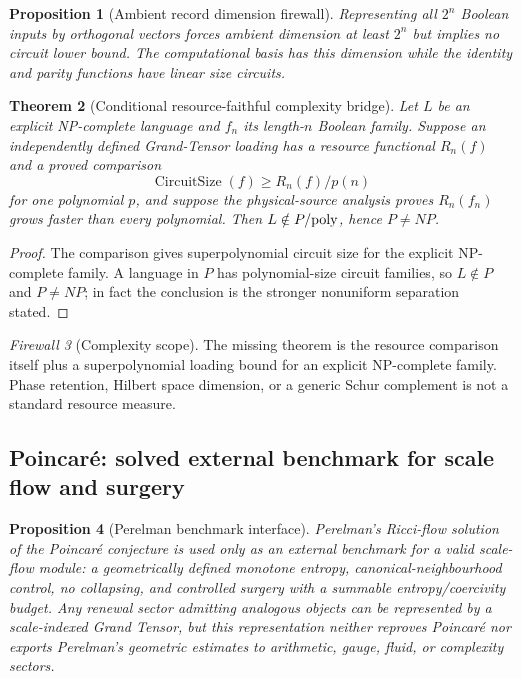 \documentclass[11pt]{article}
\newtheorem{theorem}{Theorem}[section]
\newtheorem{proposition}[theorem]{Proposition}
\theoremstyle{definition}
\theoremstyle{remark}
\newtheorem{firewall}[theorem]{Firewall}
\begin{document}
\begin{proposition}[Ambient record dimension firewall]
\label{prop:PvsNP-dimension-master}
Representing all $2^n$ Boolean inputs by orthogonal vectors forces ambient
dimension at least $2^n$ but implies no circuit lower bound.  The computational
basis has this dimension while the identity and parity functions have linear
size circuits.
\end{proposition}

\begin{theorem}[Conditional resource-faithful complexity bridge]
\label{thm:PvsNP-bridge-master}
Let $L$ be an explicit NP-complete language and $f_n$ its length-$n$ Boolean
family.  Suppose an independently defined Grand-Tensor loading has a resource
functional $R_n(f)$ and a proved comparison
\[
 \operatorname{CircuitSize}(f)\ge R_n(f)/p(n)
\]
for one polynomial $p$, and suppose the physical-source analysis proves
$R_n(f_n)$ grows faster than every polynomial.  Then
$L\notin P/{\rm poly}$, hence $P\ne NP$.
\end{theorem}

\begin{proof}
The comparison gives superpolynomial circuit size for the explicit NP-complete
family.  A language in $P$ has polynomial-size circuit families, so $L\notin
P$ and $P\ne NP$; in fact the conclusion is the stronger nonuniform
separation stated.
\end{proof}

\begin{firewall}[Complexity scope]
The missing theorem is the resource comparison itself plus a superpolynomial
loading bound for an explicit NP-complete family.  Phase retention, Hilbert
space dimension, or a generic Schur complement is not a standard resource
measure.
\end{firewall}

\subsection{Poincar\'e: solved external benchmark for scale flow and surgery}

\begin{proposition}[Perelman benchmark interface]
\label{prop:Poincare-benchmark}
Perelman's Ricci-flow solution of the Poincar\'e conjecture
\cite{PerelmanEntropy,PerelmanSurgery} is used only as an
external benchmark for a valid scale-flow module: a geometrically defined
monotone entropy, canonical-neighbourhood control, no collapsing, and
controlled surgery with a summable entropy/coercivity budget.  Any renewal
sector admitting analogous objects can be represented by a scale-indexed
Grand Tensor, but this representation neither reproves Poincar\'e nor exports
Perelman's geometric estimates to arithmetic, gauge, fluid, or complexity
sectors.
\end{proposition}
\end{document}
